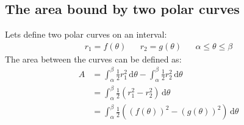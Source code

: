 \documentclass{report}
\begin{document}
    \subsection{The area bound by two polar curves}
        Lets define two polar curves on an interval:
        \begin{align*}
            r_1 = f(\theta) &&
            r_2 = g(\theta) &&
            \alpha \leq \theta \leq \beta
        \end{align*}
        The area between the curves can be defined as:
        \begin{align*}
            A &= \int_\alpha^\beta \frac{1}{2} r_1^2 \, \mathrm{d} \theta - \int_\alpha^\beta \frac{1}{2} r_2^2 \, \mathrm{d} \theta \\
            &= \int_\alpha^\beta \frac{1}{2} (r_1^2 - r_2^2) \, \mathrm{d} \theta \\
            &= \int_\alpha^\beta \frac{1}{2} \left( (f(\theta))^2 - (g(\theta))^2 \right) \, \mathrm{d} \theta
        \end{align*}
    
\end{document}
